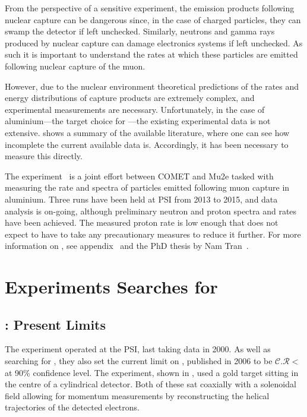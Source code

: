 From the perspective of a sensitive \mueconv experiment, the emission products following nuclear capture can be dangerous since, in the case of charged particles, they can swamp the detector if left unchecked.
Similarly, neutrons and gamma rays produced by nuclear capture can damage electronics systems if left unchecked.
As such it is important to understand the rates at which these particles are emitted following nuclear capture of the muon.

However, due to the nuclear environment theoretical predictions of the rates and energy distributions of capture products are extremely complex, and experimental measurements are necessary.
Unfortunately, in the case of aluminium---the target choice for \COMET---the existing experimental data is not extensive.
 shows a summary of the available literature, where one can see how incomplete the current available data is.
Accordingly, it has been necessary to measure this directly.

The \alcap experiment~\cite{AlcapProposal2012} is a joint effort between COMET and Mu2e tasked with measuring the rate and spectra of particles emitted following muon capture in aluminium.
Three runs have been held at \ac{PSI} from 2013 to 2015, and data analysis is on-going, although preliminary neutron and proton spectra and rates have been achieved.
The measured proton rate is low enough that \COMET does not expect to have to take any precautionary measures to reduce it further.
For more information on \alcap, see appendix~ and the PhD thesis by Nam Tran~\cite{NamThesis}.

\section{Experiments Searches for \mueconv }
\subsection{\sindrumII: Present Limits}
\FigMuecSindrumII
The \sindrumII experiment operated at the \ac{PSI}, last taking data in 2000.
As well as searching for \muThreeE, they also set the 
current limit on \mueconv, published in 2006 to be $\mathcal{C.R}<$\senseSindrum at 90\% confidence level.
The experiment, shown in , used a gold target sitting in the centre of a cylindrical detector.
Both of these sat coaxially with a solenoidal field allowing for momentum measurements by reconstructing the helical trajectories of the detected electrons.

